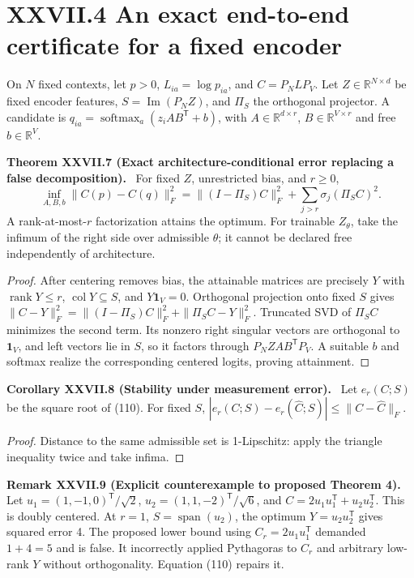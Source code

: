 \documentclass[11pt,a4paper,oneside]{book}
\newcommand{\R}{\mathbb R}\newcommand{\C}{\mathbb C}\newcommand{\Z}{\mathbb Z}\newcommand{\N}{\mathbb N}\newcommand{\Q}{\mathbb Q}
\newcommand{\one}{\mathbf 1}\newcommand{\ii}{\mathrm i}\newcommand{\dd}{\mathrm d}
\DeclareMathOperator{\rank}{rank}\DeclareMathOperator{\Tr}{Tr}
\newcommand{\statement}[3]{\par\medskip\noindent\textbf{#1 #2 (#3).}\ }
\begin{document}
\section*{XXVII.4 An exact end-to-end certificate for a fixed encoder}
On $N$ fixed contexts, let $p>0$, $L_{ia}=\log p_{ia}$, and $C=P_NLP_V$. Let $Z\in\R^{N\times d}$ be fixed encoder features, $S=\operatorname{Im}(P_NZ)$, and $\Pi_S$ the orthogonal projector. A candidate is $q_{ia}=\operatorname{softmax}_a(z_iAB^{\mathsf T}+b)$, with $A\in\R^{d\times r}$, $B\in\R^{V\times r}$ and free $b\in\R^V$.
\statement{Theorem}{XXVII.7}{Exact architecture-conditional error replacing a false decomposition} For fixed $Z$, unrestricted bias, and $r\ge0$,
\begin{equation}\inf_{A,B,b}\|C(p)-C(q)\|_F^2=\|(I-\Pi_S)C\|_F^2+\sum_{j>r}\sigma_j(\Pi_SC)^2.\tag{110}\end{equation}
A rank-at-most-$r$ factorization attains the optimum. For trainable $Z_\theta$, take the infimum of the right side over admissible $\theta$; it cannot be declared free independently of architecture.
\begin{proof}After centering removes bias, the attainable matrices are precisely $Y$ with $\rank Y\le r$, $\operatorname{col}Y\subseteq S$, and $Y\one_V=0$. Orthogonal projection onto fixed $S$ gives $\|C-Y\|_F^2=\|(I-\Pi_S)C\|_F^2+\|\Pi_SC-Y\|_F^2$. Truncated SVD of $\Pi_SC$ minimizes the second term. Its nonzero right singular vectors are orthogonal to $\one_V$, and left vectors lie in $S$, so it factors through $P_NZAB^{\mathsf T}P_V$. A suitable $b$ and softmax realize the corresponding centered logits, proving attainment.\end{proof}
\statement{Corollary}{XXVII.8}{Stability under measurement error} Let $e_r(C;S)$ be the square root of (110). For fixed $S$, $|e_r(C;S)-e_r(\widehat C;S)|\le\|C-\widehat C\|_F$.
\begin{proof}Distance to the same admissible set is 1-Lipschitz: apply the triangle inequality twice and take infima.\end{proof}
\statement{Remark}{XXVII.9}{Explicit counterexample to proposed Theorem 4} Let $u_1=(1,-1,0)^{\mathsf T}/\sqrt2$, $u_2=(1,1,-2)^{\mathsf T}/\sqrt6$, and $C=2u_1u_1^{\mathsf T}+u_2u_2^{\mathsf T}$. This is doubly centered. At $r=1$, $S=\operatorname{span}(u_2)$, the optimum $Y=u_2u_2^{\mathsf T}$ gives squared error 4. The proposed lower bound using $C_r=2u_1u_1^{\mathsf T}$ demanded $1+4=5$ and is false. It incorrectly applied Pythagoras to $C_r$ and arbitrary low-rank $Y$ without orthogonality. Equation (110) repairs it.
\end{document}
